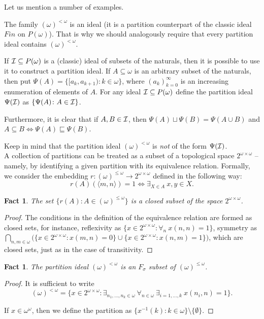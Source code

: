\documentclass[12pt]{article}
\theoremstyle{plain}
\newtheorem{fact}[theorem]{Fact}
\theoremstyle{definition}
\theoremstyle{remark}
\newcommand{\cI}{{\cal I}}
\newcommand{\Part}{(\omega)^{\leq\omega}}
\newcommand{\FinPart}{(\omega)^{<\omega}}
\begin{document}
Let us mention a number of examples.

The family $\FinPart$ is an ideal (it is a partition counterpart of the classic ideal $Fin$ on $P(\omega)$).
That is why we should analogously require that every partition ideal contains $\FinPart$.

If $\cI\subseteq P(\omega)$ is a (classic) ideal of subsets of the naturals, then it is possible to use it to construct a partition ideal. If $A\subseteq\omega$ is an arbitrary subset of the naturals, then put $\Psi(A) = 
\{[a_k, a_{k+1}) \colon k\in\omega\}$, where
$(a_k)_{k=0}^{\infty}$ is an increasing enumeration of elements of $A$. For any ideal $\cI \subseteq P(\omega)$ define the partition ideal $\Psi(\cI)$ as $\{\Psi(A)\colon A\in\cI\}$.

Furthermore, it is clear that if $A,B\in\cI$, then
$\Psi(A)\sqcup \Psi(B) = \Psi(A \cup B)$
and $A \subseteq B \iff \Psi(A) \sqsubseteq \Psi(B)$.

Keep in mind that the partition ideal $\FinPart$ is \textit{not} of the form $\Psi(\cI)$.\\


A collection of partitions can be treated as a subset of a topological space $2^{\omega\times\omega}$ -- namely, by identifying a given partition with its equivalence relation. Formally, we consider the embedding $r\colon\Part\to 2^{\omega\times\omega}$ defined in the following way:
$$r(A)(\langle m,n\rangle) = 1 \iff \exists_{X\in A}\ x, y \in X.$$

\begin{fact}
The set $\{r(A)\colon A\in\Part\}$ is a closed subset of the space $2^{\omega\times\omega}$.
\end{fact}

\begin{proof}
The conditions in the definition of the equivalence relation are formed as closed sets, for instance, reflexivity as $\{x\in 2^{\omega\times\omega} \colon \forall_{n}\ x(n, n) = 1\}$, symmetry as 
$\bigcap_{n,m\in\omega} \big(\{x\in 2^{\omega\times\omega}\colon 
x(m,n) = 0 \} \cup \{x\in 2^{\omega\times\omega} 
\colon x(n,m) = 1\}\big)$, which are closed sets, just as in the case of transitivity.
\end{proof}

\begin{fact}
The partition ideal $\FinPart$ is an $F_{\sigma}$ subset of $\Part$.
\end{fact}
\begin{proof}
It is sufficient to write
\[\FinPart = \{
x\in 2^{\omega\times\omega} \colon
\exists_{n_1,\ldots,n_k\in\omega}\ 
\forall_{n\in\omega}\ \exists_{i=1,\ldots,k}\ 
x(n_i,n) = 1
\}.\]

If $x \in \omega^\omega$, then we define the partition as
$\{ x^{-1}(k)\colon k\in\omega \} \setminus \{\emptyset\}$.
\end{proof}
\end{document}
